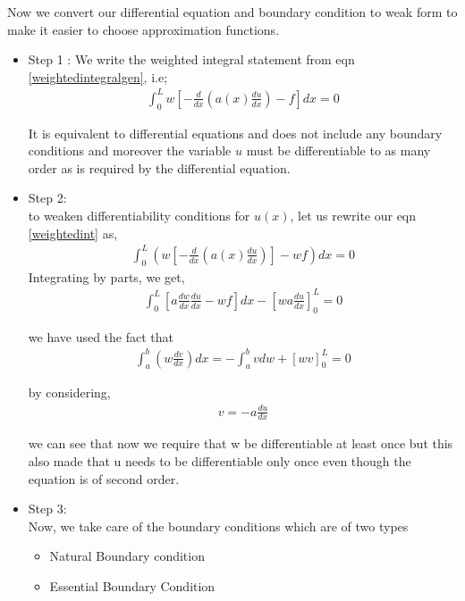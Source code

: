 	Now we convert our differential equation and boundary condition to weak form to make it easier to choose approximation functions.
\begin{itemize}
	\item Step 1 :
	We write the weighted integral statement from eqn \ref{weightedintegralgen}, i.e;
	\begin{eqnarray}\label{weightedint}\label{weightedintform}
		\int_{0}^{L}  w \left[ -\frac{d}{dx} \left( a(x)\frac{du}{dx} \right) - f \right] dx = 0
	\end{eqnarray}

	It is equivalent to differential equations and does not include any boundary conditions and moreover the variable $u$ must be differentiable to as many order as is required by the differential equation.
	\item Step 2:\\
	to weaken differentiability conditions for $u(x)$, let us rewrite our eqn \ref{weightedint} as,
	\begin{eqnarray}
		\int_{0}^{L}  \left( w \left[ -\frac{d}{dx} \left( a(x)\frac{du}{dx} \right) \right] - wf \right)  dx = 0
	\end{eqnarray}
	Integrating by parts, we get,
	\begin{eqnarray}\label{weakform1}
		\int_{0}^{L} \left[ a \frac{dw}{dx} \frac{du}{dx} - wf \right] dx  - \left[ wa \frac{du}{dx}\right]_0^L = 0
	\end{eqnarray}


	we have used the fact that 
	\begin{eqnarray}
		\int_{a}^{b} \left( w \frac{dv}{dx} \right)dx  =  -\int_{a}^{b} v dw + \left[wv\right]_0^L = 0
	\end{eqnarray}

by considering,
	\begin{eqnarray}
		v = -a\frac{du}{dx}
	\end{eqnarray}

we can see that now we require that w be differentiable at least once but this also made that u needs to be differentiable only once even though the equation is of second order.\\
    \item Step 3:\\
    Now, we take care of the boundary conditions which are of two types
\begin{itemize}
	\item Natural Boundary  condition
	\item Essential Boundary Condition 
\end{itemize}


\end{itemize}
